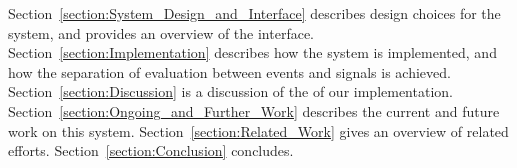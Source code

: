 
Section~\ref{section:System_Design_and_Interface} describes design choices for the system,
and provides an overview of the interface. Section~\ref{section:Implementation}
describes how the system is implemented, and how the separation of evaluation
between events and signals is achieved. Section~\ref{section:Discussion} is a
discussion of the   of our implementation. 
Section~\ref{section:Ongoing_and_Further_Work} describes the current and future
work on this system. Section~\ref{section:Related_Work} gives an overview of
related efforts. Section~\ref{section:Conclusion} concludes.


